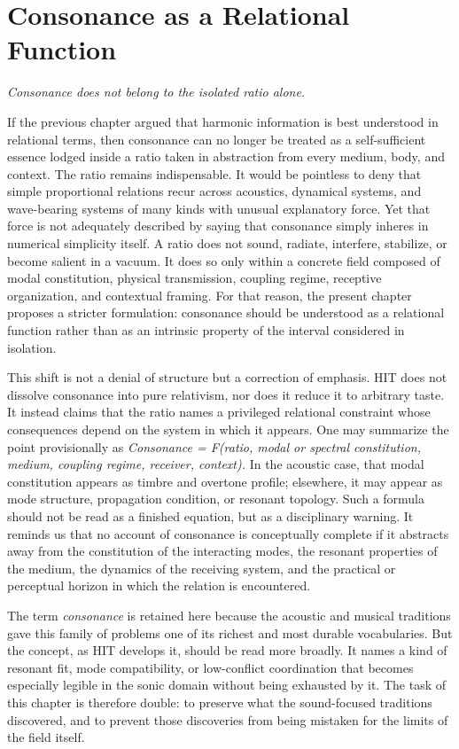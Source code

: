 \chapter{Consonance as a Relational Function}

\epigraph{\emph{Consonance does not belong to the isolated ratio alone.}}{}


If the previous chapter argued that harmonic information is best understood in relational terms, then consonance can no longer be treated as a self-sufficient essence lodged inside a ratio taken in abstraction from every medium, body, and context. The ratio remains indispensable. It would be pointless to deny that simple proportional relations recur across acoustics, dynamical systems, and wave-bearing systems of many kinds with unusual explanatory force. Yet that force is not adequately described by saying that consonance simply inheres in numerical simplicity itself. A ratio does not sound, radiate, interfere, stabilize, or become salient in a vacuum. It does so only within a concrete field composed of modal constitution, physical transmission, coupling regime, receptive organization, and contextual framing. For that reason, the present chapter proposes a stricter formulation: consonance should be understood as a relational function rather than as an intrinsic property of the interval considered in isolation.

This shift is not a denial of structure but a correction of emphasis. HIT does not dissolve consonance into pure relativism, nor does it reduce it to arbitrary taste. It instead claims that the ratio names a privileged relational constraint whose consequences depend on the system in which it appears. One may summarize the point provisionally as \emph{Consonance = F(ratio, modal or spectral constitution, medium, coupling regime, receiver, context).} In the acoustic case, that modal constitution appears as timbre and overtone profile; elsewhere, it may appear as mode structure, propagation condition, or resonant topology. Such a formula should not be read as a finished equation, but as a disciplinary warning. It reminds us that no account of consonance is conceptually complete if it abstracts away from the constitution of the interacting modes, the resonant properties of the medium, the dynamics of the receiving system, and the practical or perceptual horizon in which the relation is encountered.

The term \emph{consonance} is retained here because the acoustic and musical traditions gave this family of problems one of its richest and most durable vocabularies. But the concept, as HIT develops it, should be read more broadly. It names a kind of resonant fit, mode compatibility, or low-conflict coordination that becomes especially legible in the sonic domain without being exhausted by it. The task of this chapter is therefore double: to preserve what the sound-focused traditions discovered, and to prevent those discoveries from being mistaken for the limits of the field itself.


